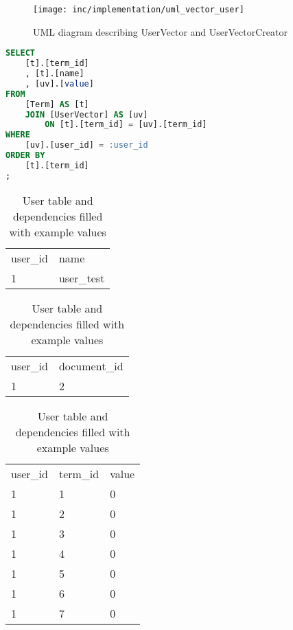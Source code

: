 \begin{figure}[h]
    \center
    \texttt{[image: inc/implementation/uml\_vector\_user]}
    \caption{UML diagram describing UserVector and UserVectorCreator}
    \label{fig:uml_vector_user}
\end{figure}

\begin{lstlisting}[language=SQL,caption={SQL query for creating a user vector},label={lst:user-vector-query},float=h]
SELECT
    [t].[term_id]
    , [t].[name]
    , [uv].[value]
FROM
    [Term] AS [t]
    JOIN [UserVector] AS [uv]
        ON [t].[term_id] = [uv].[term_id]
WHERE
    [uv].[user_id] = :user_id
ORDER BY
    [t].[term_id]
;
\end{lstlisting}

\begin{table}
    \begin{tabular}{ l | l }
        \rowcolor{\dustRowHead}
        \multicolumn{2}{c}{\textbf{User}}\\\hline
        user\_id    & name \\\hline
        1           & user\_test\\
    \end{tabular}
    \quad
    \begin{tabular}{ l | l }
        \rowcolor{\dustRowHead}
        \multicolumn{2}{c}{UserPreference}\\\hline
        user\_id    & document\_id\\\hline
        1           & 2\\
    \end{tabular}
    \quad
    \begin{tabular}{ l | l | l }
        \rowcolor{\dustRowHead}
        \multicolumn{3}{c}{UserVector}\\\hline
        user\_id    & term\_id  & value\\\hline
        1           & 1         & 0\\
        1           & 2         & 0\\
        1           & 3         & 0\\
        1           & 4         & 0\\
        1           & 5         & 0\\
        1           & 6         & 0\\
        1           & 7         & 0\\
    \end{tabular}
    \caption{User table and dependencies filled with example values}
    \label{tab:user}
\end{table}

